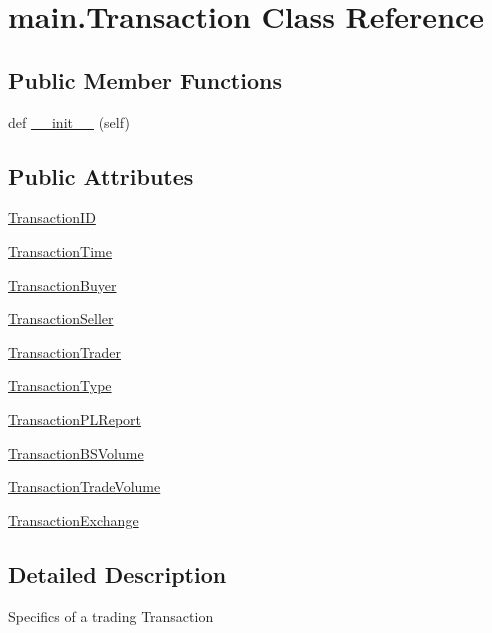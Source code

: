 \hypertarget{classmain_1_1_transaction}{}\section{main.\+Transaction Class Reference}
\label{classmain_1_1_transaction}
\subsection*{Public Member Functions}
\begin{DoxyCompactItemize}
\item 
def \hyperlink{classmain_1_1_transaction_af38a077166d23bd00b6c3008e3f5e896}{\+\_\+\+\_\+init\+\_\+\+\_\+} (self)
\end{DoxyCompactItemize}
\subsection*{Public Attributes}
\begin{DoxyCompactItemize}
\item 
\hyperlink{classmain_1_1_transaction_af225ee92dab823508ce8d19b5c6e94e8}{Transaction\+I\+D}
\item 
\hyperlink{classmain_1_1_transaction_a3bb1b5f24cbdd79d001691b59991c8a2}{Transaction\+Time}
\item 
\hyperlink{classmain_1_1_transaction_adfa57a1b2af3c43fb9150651f37276e2}{Transaction\+Buyer}
\item 
\hyperlink{classmain_1_1_transaction_aae29ee1480725a9e0a7d8c61aa3e9d5a}{Transaction\+Seller}
\item 
\hyperlink{classmain_1_1_transaction_a72c003d322f6d0d3ed5da4dcbcab72e7}{Transaction\+Trader}
\item 
\hyperlink{classmain_1_1_transaction_a689eae0972a251bc871a00dc4baad575}{Transaction\+Type}
\item 
\hyperlink{classmain_1_1_transaction_a200dec28203b27b61132d1f3ae9c9bb4}{Transaction\+P\+L\+Report}
\item 
\hyperlink{classmain_1_1_transaction_add4a0bfff8f211154602b499ef659376}{Transaction\+B\+S\+Volume}
\item 
\hyperlink{classmain_1_1_transaction_aa02d22f0712facfcee226da493037be2}{Transaction\+Trade\+Volume}
\item 
\hyperlink{classmain_1_1_transaction_a224b457a41861571752c995aeb276b5f}{Transaction\+Exchange}
\end{DoxyCompactItemize}


\subsection{Detailed Description}
\begin{DoxyVerb}Specifics of a trading Transaction\end{DoxyVerb}
 

